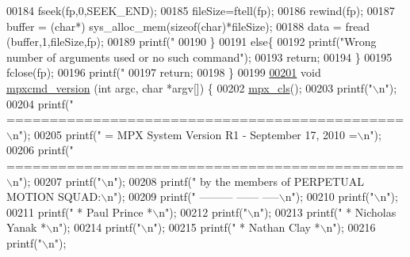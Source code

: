 \begin{DoxyCode}
{{{{{{{{{00184                 fseek(fp,0,SEEK\_END);
00185                 fileSize=ftell(fp);
00186                 rewind(fp);
00187                 buffer = (\textcolor{keywordtype}{char}*) sys\_alloc\_mem(\textcolor{keyword}{sizeof}(\textcolor{keywordtype}{char})*fileSize);
00188                 data = fread (buffer,1,fileSize,fp);
00189                 printf(\textcolor{stringliteral}{"%
00190         \}
00191         \textcolor{keywordflow}{else}\{
00192                 printf(\textcolor{stringliteral}{"Wrong number of arguments used or no such command"});    
00193                 \textcolor{keywordflow}{return};
00194         \}
00195         fclose(fp);
00196         printf(\textcolor{stringliteral}{"%
00197         \textcolor{keywordflow}{return};
00198 \}
00199 
\hypertarget{mpx__cmd_8c_source_l00201}{}\hyperlink{mpx__cmd_8h_a70a1ce3926ea7c41321ab42b4161df0d}{00201} \textcolor{keywordtype}{void} \hyperlink{mpx__cmd_8c_a70a1ce3926ea7c41321ab42b4161df0d}{mpxcmd_version} (\textcolor{keywordtype}{int} argc, \textcolor{keywordtype}{char} *argv[]) \{
00202         \hyperlink{mpx__util_8c_a8cf3281978ba1652fd5d643e1a41f70b}{mpx_cls}();
00203         printf(\textcolor{stringliteral}{"\(\backslash\)n"});
00204         printf(\textcolor{stringliteral}{"  ==============================================\(\backslash\)n"});
00205         printf(\textcolor{stringliteral}{"  = MPX System Version R1 - September 17, 2010 =\(\backslash\)n"});
00206         printf(\textcolor{stringliteral}{"  ==============================================\(\backslash\)n"});
00207         printf(\textcolor{stringliteral}{"\(\backslash\)n"});
00208         printf(\textcolor{stringliteral}{"      by the members of PERPETUAL MOTION SQUAD:\(\backslash\)n"});
00209         printf(\textcolor{stringliteral}{"                        --------- ------ -----\(\backslash\)n"});
00210         printf(\textcolor{stringliteral}{"\(\backslash\)n"});
00211         printf(\textcolor{stringliteral}{"             *  Paul Prince  *\(\backslash\)n"});
00212         printf(\textcolor{stringliteral}{"\(\backslash\)n"});
00213         printf(\textcolor{stringliteral}{"                     *  Nicholas Yanak  *\(\backslash\)n"});
00214         printf(\textcolor{stringliteral}{"\(\backslash\)n"});
00215         printf(\textcolor{stringliteral}{"                             *  Nathan Clay  *\(\backslash\)n"});
00216         printf(\textcolor{stringliteral}{"\(\backslash\)n"});
}}}}}}}}}}}
\end{DoxyCode}
